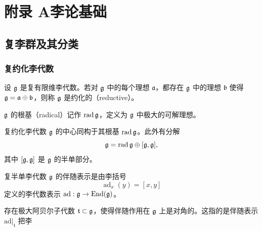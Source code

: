 
\chapter*{附录 A\quad 李论基础}
\setcounter{section}{0}
\renewcommand{\thesection}{A.\arabic{section}}
\renewcommand{\thesubsection}{\thesection.\arabic{subsection}}


\section{复李群及其分类}

\subsection{复约化李代数}

\begin{definition}[A.1] 设 $\mathfrak{g}$ 是复有限维李代数。若对 $\mathfrak{g}$ 中的每个理想 $\mathfrak{a}$，都存在 $\mathfrak{g}$ 中的理想 $\mathfrak{b}$ 使得 $\mathfrak{g}=\mathfrak{a}\oplus\mathfrak{b}$，则称 $\mathfrak{g}$ 是约化的（reductive）。
\end{definition}

$\mathfrak{g}$ 的根基（radical）记作 $\operatorname{rad}\mathfrak{g}$，定义为 $\mathfrak{g}$ 中极大的可解理想。

复约化李代数 $\mathfrak{g}$ 的中心同构于其根基 $\operatorname{rad}\mathfrak{g}$。此外有分解
\[
\mathfrak{g}=\operatorname{rad}\mathfrak{g}\oplus[\mathfrak{g},\mathfrak{g}],
\]
其中 $[\mathfrak{g},\mathfrak{g}]$ 是 $\mathfrak{g}$ 的半单部分。

复半单李代数 $\mathfrak{g}$ 的伴随表示是由李括号
\[
\operatorname{ad}_x(y)=[x,y]
\]
定义的李代数表示 $\mathrm{ad}:\mathfrak{g}\to\operatorname{End}(\mathfrak{g})$。

存在极大阿贝尔子代数 $\mathfrak{t}\subset\mathfrak{g}$，使得伴随作用在 $\mathfrak{g}$ 上是对角的。这指的是伴随表示 $\mathrm{ad}|_{\mathfrak{t}}$ 把李

